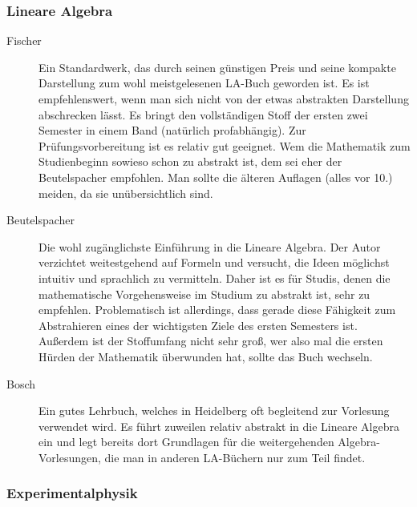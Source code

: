 \subsubsection*{Lineare Algebra}
\begin{description}
\item[Fischer]{
		Ein Standardwerk, das durch seinen günstigen Preis und seine kompakte Darstellung zum wohl meistgelesenen LA-Buch geworden ist. Es ist empfehlenswert, wenn man sich nicht von der etwas abstrakten Darstellung abschrecken lässt. Es bringt den vollständigen Stoff der ersten zwei Semester in einem Band (natürlich profabhängig). Zur Prüfungsvorbereitung ist es relativ gut geeignet. Wem die Mathematik zum Studienbeginn sowieso schon zu abstrakt ist, dem sei eher der Beutelspacher empfohlen. Man sollte die älteren Auflagen (alles vor 10.) meiden, da sie unübersichtlich sind.}

\item[Beutelspacher]{
		Die wohl zugänglichste Einführung in die Lineare Algebra. Der Autor verzichtet weitestgehend auf Formeln und versucht, die Ideen möglichst intuitiv und sprachlich zu vermitteln. Daher ist es für Studis, denen die mathematische Vorgehensweise im Studium zu abstrakt ist, sehr zu empfehlen. Problematisch ist allerdings, dass gerade diese Fähigkeit zum Abstrahieren eines der wichtigsten Ziele des ersten Semesters ist. Außerdem ist der Stoffumfang nicht sehr groß, wer also mal die ersten Hürden der Mathematik überwunden hat, sollte das Buch wechseln.}

\item[Bosch]{
		Ein gutes Lehrbuch, welches in Heidelberg oft begleitend zur Vorlesung verwendet wird. Es führt zuweilen relativ abstrakt in die Lineare Algebra ein und legt bereits dort Grundlagen für die weitergehenden Algebra-Vorlesungen, die man in anderen LA-Büchern nur zum Teil findet.}
\end{description}

\subsubsection{Experimentalphysik}

